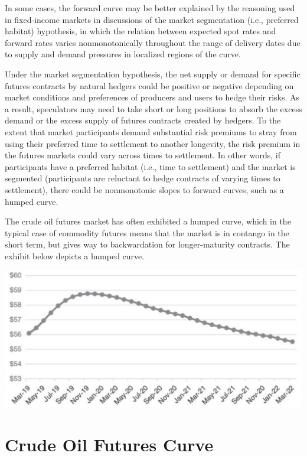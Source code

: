 \documentclass[11pt]{article}
\begin{document}
In some cases, the forward curve may be better explained by the reasoning used in fixed-income markets in discussions of the market segmentation (i.e., preferred habitat) hypothesis, in which the relation between expected spot rates and forward rates varies nonmonotonically throughout the range of delivery dates due to supply and demand pressures in localized regions of the curve.

Under the market segmentation hypothesis, the net supply or demand for specific futures contracts by natural hedgers could be positive or negative depending on market conditions and preferences of producers and users to hedge their risks. As a result, speculators may need to take short or long positions to absorb the excess demand or the excess supply of futures contracts created by hedgers. To the extent that market participants demand substantial risk premiums to stray from using their preferred time to settlement to another longevity, the risk premium in the futures markets could vary across times to settlement. In other words, if participants have a preferred habitat (i.e., time to settlement) and the market is segmented (participants are reluctant to hedge contracts of varying times to settlement), there could be nonmonotonic slopes to forward curves, such as a humped curve.

The crude oil futures market has often exhibited a humped curve, which in the typical case of commodity futures means that the market is in contango in the short term, but gives way to backwardation for longer-maturity contracts. The exhibit below depicts a humped curve.

\begin{center}
\includegraphics[max width=\textwidth]{2024_04_11_0af5e5bdb875454d1acag-3}
\end{center}

\section*{Crude Oil Futures Curve}
\end{document}
